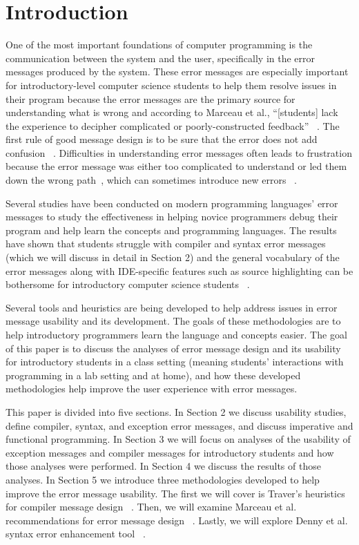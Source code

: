 \documentclass{sig-alternate}
\begin{document}
\section{Introduction}\label{sec:intro}
One of the most important foundations of computer programming is the communication between the system and the user, specifically in the error messages produced by the system.
These error messages are especially important for introductory-level computer science students to help them resolve issues in their program because the error messages are the primary source for understanding what is wrong and according to Marceau et al., ``[students] lack the experience to decipher complicated or poorly-constructed feedback'' ~\cite{Marceau:2011:MEE:1953163.1953308}.
The first rule of good message design is to be sure that the error does not add confusion ~\cite{Isa:1983:MOE:800045.801583}.
Difficulties in understanding error messages often leads to frustration because the error message was either too complicated to understand or led them down the wrong path~\cite{Marceau:2011:MYL:2048237.2048241}, which can sometimes introduce new errors ~\cite{Denny:2014:ESE:2591708.2591748}. 

Several studies have been conducted on modern programming languages' error messages to study the effectiveness in helping novice programmers debug their program and help learn the concepts and programming languages.
The results have shown that students struggle with compiler and syntax error messages ~\cite{Denny:2014:ESE:2591708.2591748} ~\cite{Traver:2010} (which we will discuss in detail in Section 2) and the general vocabulary of the error messages along with IDE-specific features such as source highlighting can be bothersome for introductory computer science students ~\cite{Marceau:2011:MYL:2048237.2048241}. 

Several tools and heuristics are being developed to help address issues in error message usability and its development.
The goals of these methodologies are to help introductory programmers learn the language and concepts easier.
The goal of this paper is to discuss the analyses of error message design and its usability for introductory students in a class setting (meaning students' interactions with programming in a lab setting and at home), and how these developed methodologies help improve the user experience with error messages. 

This paper is divided into five sections.
In Section 2 we discuss usability studies, define compiler, syntax, and exception error messages, and discuss imperative and functional programming.
In Section 3 we will focus on  analyses of the usability of exception messages and compiler messages for introductory students and how those analyses were performed.
In Section 4 we discuss the results of those analyses.
In Section 5 we introduce three methodologies developed to help improve the error message usability.
The first we will cover is Traver's heuristics for compiler message design ~\cite{Traver:2010}.
Then, we will examine Marceau et al. recommendations for error message design ~\cite{Marceau:2011:MYL:2048237.2048241}.
Lastly, we will explore Denny et al. syntax error enhancement tool ~\cite{Denny:2014:ESE:2591708.2591748}.
\end{document}
